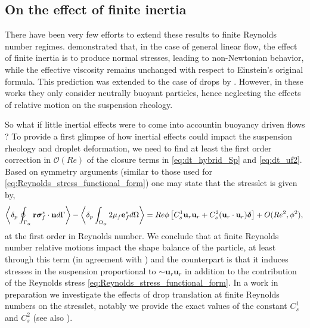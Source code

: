 \subsection{On the effect of finite inertia}

There have been very few efforts to extend these results to finite Reynolds number regimes. \citet{stone2001inertial} demonstrated that, in the case of general linear flow, the effect of finite inertia is to produce normal stresses, leading to non-Newtonian behavior, while the effective viscosity remains unchanged with respect to Einstein's original formula. 
This prediction was extended to the case of drops by \citet{raja2010inertial}. 
However, in these works they only consider neutrally buoyant particles, hence neglecting the effects of relative motion on the suspension rheology. 

So what if little inertial effects were to come into accountin buoyancy driven flows ?
To provide a first glimpse of how inertial effects could impact the suspension rheology and droplet deformation, we need to find at least the first order correction in $\mathcal{O}(Re)$ of the closure terms in \ref{eq:dt_hybrid_Sp} and \ref{eq:dt_uf2}. 
Based on symmetry arguments (similar to those used for \ref{eq:Reynolds_stress_functional_form}) one may state that the stresslet is given by, 
\begin{equation}
    \left<\delta_{p} \oint_{\Gamma_{\alpha}} \textbf{r}\bm\sigma^*_f\cdot \textbf{n} d\Gamma\right>
    -\left<\delta_{p} \int_{\Omega_{\alpha}} 2\mu_f\textbf{e}^*_f d\Omega\right>
    =
    Re \phi 
    \left[
       C_s^1 \textbf{u}_{r}\textbf{u}_{r} 
    +  C_s^2 (\textbf{u}_{r}\cdot \textbf{u}_{r})\bm\delta
    \right]
    + O(Re^2,\phi^2),
    \\
\end{equation}
at the first order in Reynolds number. 
We conclude that at finite Reynolds number relative motions impact the shape balance of the particle, at least through this term (in agreement with \citet{taylor1964deformation}) and the counterpart is that it induces stresses in the suspension proportional to $\sim \textbf{u}_r\textbf{u}_r$ in addition to the contribution of the Reynolds stress \eqref{eq:Reynolds_stress_functional_form}. 
In a work in preparation we investigate the effects of drop translation at finite Reynolds numbers on the stresslet, notably we provide the exact values of the constant $C_s^{1}$ and $C_s^{2}$ (see also \citet{fintzi2025}). 
 


